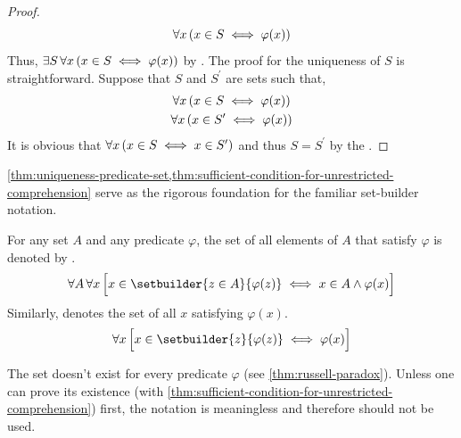 \begin{proof}
\begin{equation*}
        \forall x \, \mleft( x \in S \iff \varphi(x) \mright)
    \end{equation*}
    Thus, \( \exists  S \, \forall x \, \mleft( x \in S \iff \varphi(x) \mright) \) by .
    The proof for the uniqueness of \( S \) is straightforward.
    Suppose that \( S \) and \( S^{\prime} \) are sets such that,
    \begin{gather*}
        \forall x \, \mleft( x \in S \iff \varphi(x) \mright) \\
        \forall x \, \mleft( x \in S^{\prime} \iff \varphi(x) \mright)
    \end{gather*}
    It is obvious that \( \forall x \, \mleft( x \in S \iff x \in S^{\prime} \mright) \) and thus \( S = S^{\prime} \)
    by the .
\end{proof}

\begin{rem}
    \cref{thm:uniqueness-predicate-set,thm:sufficient-condition-for-unrestricted-comprehension} serve as the rigorous foundation for the familiar set-builder notation.
\end{rem}

\begin{dfn}
    \label{dfn:set-builder-notation}
    For any set \( A \) and any predicate \( \varphi \), the set
    of all elements of \( A \) that satisfy \( \varphi \) is denoted by
    .
    \begin{equation*}
        \forall A \, \forall x \, \Big[ x \in \setbuilder{z \in A}{\varphi(z)} \iff x \in A \land \varphi(x) \Big]
    \end{equation*}
    Similarly,  denotes the set of all \( x \) satisfying \( \varphi(x) \).
    \begin{equation*}
        \forall x \, \Big[ x \in \setbuilder{z}{\varphi(z)} \iff \varphi(x) \Big]
    \end{equation*}
\end{dfn}

\begin{rem}
    The set  doesn't exist for every predicate \( \varphi \) (see \cref{thm:russell-paradox}).
    Unless one can prove its existence (with \cref{thm:sufficient-condition-for-unrestricted-comprehension}) first, the notation
     is meaningless and therefore should not be used.
\end{rem}

